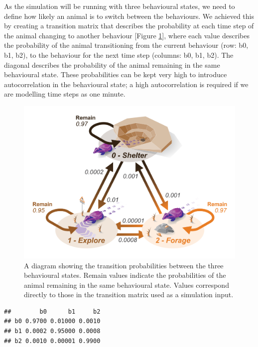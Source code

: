 \documentclass[10pt,a4paper]{article}
\begin{document}
As the simulation will be running with three behavioural states, we need to define how likely an animal is to switch between the behaviours.
We achieved this by creating a transition matrix that describes the probability at each time step of the animal changing to another behaviour {[}Figure \ref{fig:transMatrixDiagram}{]}, where each value describes the probability of the animal transitioning from the current behaviour (row: b0, b1, b2), to the behaviour for the next time step (columns: b0, b1, b2).
The diagonal describes the probability of the animal remaining in the same behavioural state.
These probabilities can be kept very high to introduce autocorrelation in the behavioural state; a high autocorrelation is required if we are modelling time steps as one minute.

\begin{figure}

{\centering \includegraphics[width=0.8\linewidth]{../ext_figures/Tranistion Matrix Diagram} 

}

\caption{A diagram showing the transition probabilities between the three behavioural states. Remain values indicate the probabilities of the animal remaining in the same behavioural state. Values correspond directly to those in the transition matrix used as a simulation input.}\label{fig:transMatrixDiagram}
\end{figure}

\begin{verbatim}
##        b0      b1     b2
## b0 0.9700 0.01000 0.0010
## b1 0.0002 0.95000 0.0008
## b2 0.0010 0.00001 0.9900
\end{verbatim}
\end{document}
